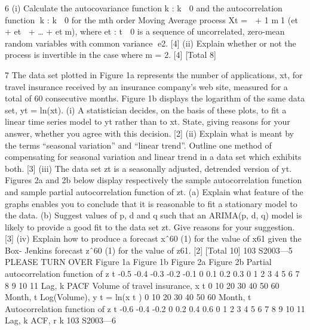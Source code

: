 6 (i) Calculate the autocovariance function {
k : k  0} and the autocorrelation
function {k : k  0} for the mth order Moving Average process
Xt =  + 1
m1
(et + et + … + etm),
where {et : t  0} is a sequence of uncorrelated, zero-mean random variables
with common variance e2. [4]
(ii) Explain whether or not the process is invertible in the case where m = 2. [4]
[Total 8]

7 The data set plotted in Figure 1a represents the number of applications, xt, for travel
insurance received by an insurance company’s web site, measured for a total of 60
consecutive months. Figure 1b displays the logarithm of the same data set, yt = ln(xt).
(i) A statistician decides, on the basis of these plots, to fit a linear time series
model to yt rather than to xt. State, giving reasons for your answer, whether
you agree with this decision. [2]
(ii) Explain what is meant by the terms “seasonal variation” and “linear trend”.
Outline one method of compensating for seasonal variation and linear trend in
a data set which exhibits both. [3]
(iii) The data set zt is a seasonally adjusted, detrended version of yt. Figures 2a and
2b below display respectively the sample autocorrelation function and sample
partial autocorrelation function of zt.
(a) Explain what feature of the graphs enables you to conclude that it is
reasonable to fit a stationary model to the data.
(b) Suggest values of p, d and q such that an ARIMA(p, d, q) model is
likely to provide a good fit to the data set zt. Give reasons for your
suggestion. [3]
(iv) Explain how to produce a forecast xˆ60 (1) for the value of x61 given the Box-
Jenkins forecast zˆ60 (1) for the value of z61. [2]
[Total 10]
103 S2003—5 PLEASE TURN OVER
Figure 1a Figure 1b
Figure 2a
Figure 2b
Partial autocorrelation function of z t
-0.5
-0.4
-0.3
-0.2
-0.1
0
0.1
0.2
0.3
0 1 2 3 4 5 6 7 8 9 10 11
Lag, k
PACF
Volume of travel insurance, x t
0 10 20 30 40 50 60
Month, t
Log(Volume), y t = ln(x t )
0 10 20 30 40 50 60
Month, t
Autocorrelation function of z t
-0.6
-0.4
-0.2
0
0.2
0.4
0.6
0 1 2 3 4 5 6 7 8 9 10 11
Lag, k
ACF, r k
103 S2003—6


